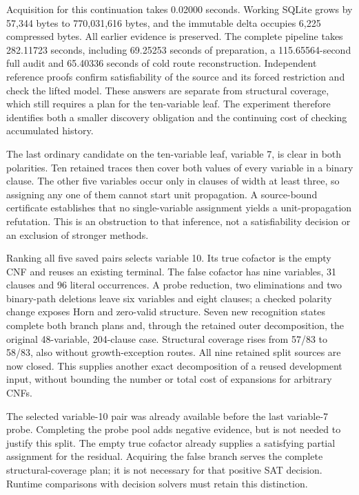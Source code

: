 \documentclass[11pt,a4paper]{article}
\numberwithin{equation}{section}
\theoremstyle{plain}
\theoremstyle{definition}
\theoremstyle{remark}
\begin{document}
Acquisition for this continuation takes 0.02000 seconds. Working SQLite grows by 57,344 bytes to 770,031,616 bytes, and the immutable delta occupies 6,225 compressed bytes. All earlier evidence is preserved. The complete pipeline takes 282.11723 seconds, including 69.25253 seconds of preparation, a 115.65564-second full audit and 65.40336 seconds of cold route reconstruction. Independent reference proofs confirm satisfiability of the source and its forced restriction and check the lifted model. These answers are separate from structural coverage, which still requires a plan for the ten-variable leaf. The experiment therefore identifies both a smaller discovery obligation and the continuing cost of checking accumulated history.

The last ordinary candidate on the ten-variable leaf, variable 7, is clear in both polarities. Ten retained traces then cover both values of every variable in a binary clause. The other five variables occur only in clauses of width at least three, so assigning any one of them cannot start unit propagation. A source-bound certificate establishes that no single-variable assignment yields a unit-propagation refutation. This is an obstruction to that inference, not a satisfiability decision or an exclusion of stronger methods.

Ranking all five saved pairs selects variable 10. Its true cofactor is the empty CNF and reuses an existing terminal. The false cofactor has nine variables, 31 clauses and 96 literal occurrences. A probe reduction, two eliminations and two binary-path deletions leave six variables and eight clauses; a checked polarity change exposes Horn and zero-valid structure. Seven new recognition states complete both branch plans and, through the retained outer decomposition, the original 48-variable, 204-clause case. Structural coverage rises from 57/83 to 58/83, also without growth-exception routes. All nine retained split sources are now closed. This supplies another exact decomposition of a reused development input, without bounding the number or total cost of expansions for arbitrary CNFs.

The selected variable-10 pair was already available before the last variable-7 probe. Completing the probe pool adds negative evidence, but is not needed to justify this split. The empty true cofactor already supplies a satisfying partial assignment for the residual. Acquiring the false branch serves the complete structural-coverage plan; it is not necessary for that positive SAT decision. Runtime comparisons with decision solvers must retain this distinction.
\end{document}
